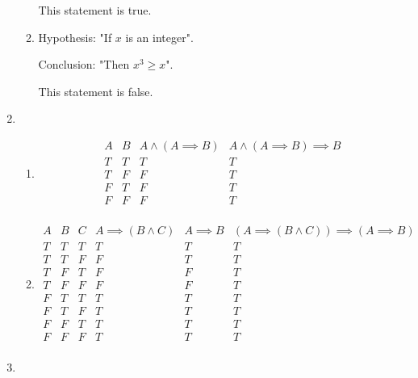 \documentclass[a4paper]{article}
\begin{document}
\begin{enumerate}
\begin{enumerate}
	This statement is true. 
	
	\item
	
	Hypothesis: "If $x$ is an integer".
	
	Conclusion: "Then $x^3 \geq x$".
	
	This statement is false.
	
	\end{enumerate}
	
\item
	\begin{enumerate}
	\item
	
	\begin{displaymath}
	\begin{array}{|c|c|c|c|}
	A & B & A \land (A \implies B) & A \land (A \implies B) 		\implies B \\
	\hline
	T & T & T & T\\
	T & F & F & T\\
	F & T & F & T\\
	F & F & F & T\\
	\end{array}
	\end{displaymath}
	
	\item
	
	\begin{displaymath}
	\begin{array}{|c|c|c|c|c|c|}
	A & B & C & A \implies (B \land C) & A \implies B & (A 			\implies (B \land C) ) \implies (A \implies B) \\
	\hline
	T & T & T & T & T & T\\
	T & T & F & F & T & T\\
	T & F & T & F & F & T\\
	T & F & F & F & F & T\\
	F & T & T & T & T & T\\
	F & T & F & T & T & T\\
	F & F & T & T & T & T\\
	F & F & F & T & T & T\\
	\end{array}
	\end{displaymath}
	
	\end{enumerate}
	
\item


\end{enumerate}
\end{document}
